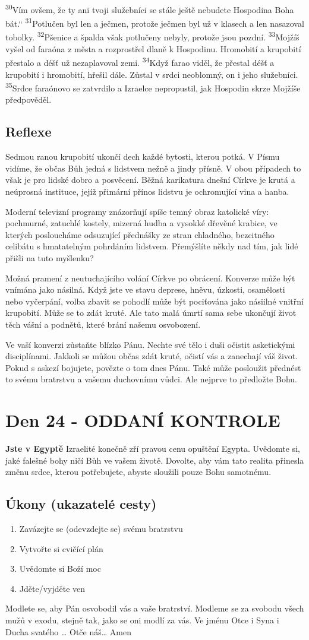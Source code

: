 \documentclass[11pt]{article}
\newcommand{\zacatekCtvrtyTyden}{
  \textbf{Jste v Egyptě} \newline
  Izraelité konečně zří pravou cenu opuštění Egypta. Uvědomte si, jaké falešné bohy ničí Bůh ve vašem životě.
Dovolte, aby vám tato realita přinesla změnu srdce, kterou potřebujete, abyste sloužili pouze Bohu samotnému.

\subsection*{Úkony (ukazatelé cesty)}
\begin{enumerate}
  \item Zavázejte se (odevzdejte se) svému bratrstvu
  \item Vytvořte si cvičící plán
  \item Uvědomte si Boží moc
  \item Jděte/vyjděte ven
\end{enumerate}
Modlete se, aby Pán osvobodil vás a vaše bratrství. \newline
Modleme se za svobodu všech mužů v exodu, stejně tak, jako se oni modlí za vás.\newline
Ve jménu Otce i Syna i Ducha svatého …  Otče náš… Amen
}
\begin{document}
{\textsuperscript{30}Vím ovšem, že ty ani tvoji služebníci se stále ještě nebudete Hospodina Boha bát.“
\textsuperscript{31}Potlučen byl len a ječmen, protože ječmen byl už v klasech a len nasazoval tobolky.
\textsuperscript{32}Pšenice a špalda však potlučeny nebyly, protože jsou pozdní.
\textsuperscript{33}Mojžíš vyšel od faraóna z města a rozprostřel dlaně k Hospodinu. Hromobití a krupobití přestalo a déšť už nezaplavoval zemi.
\textsuperscript{34}Když farao viděl, že přestal déšť a krupobití i hromobití, hřešil dále. Zůstal v srdci neoblomný, on i jeho služebníci.
\textsuperscript{35}Srdce faraónovo se zatvrdilo a Izraelce nepropustil, jak Hospodin skrze Mojžíše předpověděl.
}

\subsection*{Reflexe}
Sedmou ranou krupobití ukončí dech každé bytosti, kterou potká. V Písmu vidíme, že občas Bůh jedná s lidstvem nežně a
jindy přísně. V obou případech to však je pro lidské dobro a posvěcení.
Běžná karikatura dnešní Církve je krutá a neúprosná instituce, jejíž přimární přínos lidstvu je ochromující vina a hanba.

Moderní televizní programy znázorňují spíše temný obraz katolické víry: pochmurné, zatuchlé kostely, mizerná hudba a
vysokké dřevěné krabice, ve kterých posloucháme odsuzující přednášky ze stran chladného, bezcitného celibátu s hmatatelným
pohrdáním lidstvem. Přemýšlíte někdy nad tím, jak lidé přišli na tuto myšlenku?

Možná pramení z neutuchajícího volání Církve po obrácení. Konverze může být vnímána jako násilná. Když jste ve stavu
deprese, hněvu, úzkosti, osamělosti nebo vyčerpání, volba zbavit se pohodlí může být pociťována jako násiilné vnitřní
krupobití. Může se to zdát kruté. Ale tato malá úmrtí sama sebe ukončují život těch vášní a podnětů, které brání našemu
osvobození.

Ve vaší konverzi zůstaňte blízko Pánu. Nechte své tělo i duši očistit asketickými disciplínami. Jakkoli se můžou občas zdát
kruté, očistí vás a zanechají váš život. Pokud s askezí bojujete, povězte o tom dnes Pánu. Také může posloužit přednést to
svému bratrstvu a vašemu duchovnímu vůdci. Ale nejprve to předložte Bohu.

\newpage
\section{Den 24 - ODDANÍ KONTROLE}
\zacatekCtvrtyTyden
\end{document}
